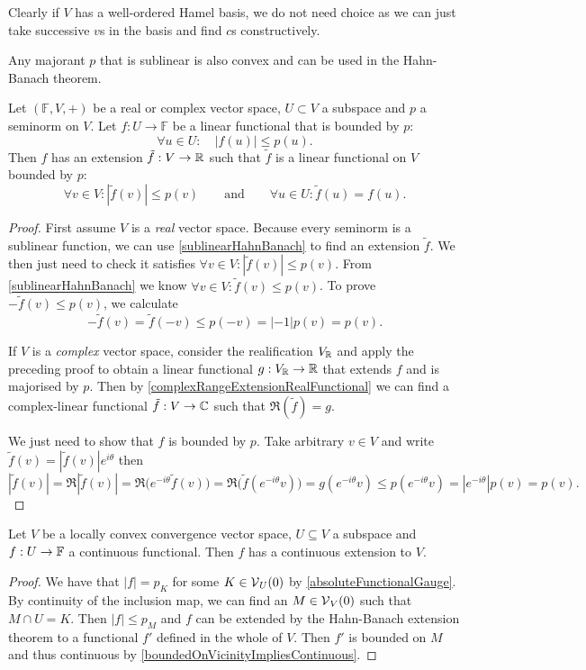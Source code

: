 Clearly if $V$ has a well-ordered Hamel basis, we do not need choice as we can just take successive $v$s in the basis and find $c$s constructively.
\begin{corollary} \label{sublinearHahnBanach}
Any majorant $p$ that is sublinear is also convex and can be used in the Hahn-Banach theorem.
\end{corollary}
\begin{corollary} \label{seminormHahnBanach}
Let $(\mathbb{F},V,+)$ be a real or complex vector space, $U\subset V$ a subspace and $p$ a seminorm on $V$. Let $f:U\to\mathbb{F}$ be a linear functional that is bounded by $p$:
\[ \forall u\in U: \quad |f(u)| \leq p(u). \]
Then $f$ has an extension $\tilde{f}: V\to \mathbb{R}$ such that $\tilde{f}$ is a linear functional on $V$ bounded by $p$:
\[ \forall v\in V: |\tilde{f}(v)| \leq p(v) \qquad \text{and} \qquad \forall u\in U: \tilde{f}(u) = f(u). \]
\end{corollary}
\begin{proof}
First assume $V$ is a \emph{real} vector space. Because every seminorm is a sublinear function, we can use \ref{sublinearHahnBanach} to find an extension $\tilde{f}$. We then just need to check it satisfies $\forall v\in V: |\tilde{f}(v)| \leq p(v)$.
From \ref{sublinearHahnBanach} we know $\forall v\in V: \tilde{f}(v) \leq p(v)$.
To prove $-\tilde{f}(v) \leq p(v)$, we calculate
\[ -\tilde{f}(v) = \tilde{f}(-v) \leq p(-v) = |-1|p(v) = p(v). \]

If $V$ is a \emph{complex} vector space, consider the realification $V_{\mathbb{R}}$ and apply the preceding proof to obtain a linear functional $g: V_{\mathbb{R}} \to \mathbb{R}$ that extends $f$ and is majorised by $p$. Then by \ref{complexRangeExtensionRealFunctional} we can find a complex-linear functional $\tilde{f}:V \to \mathbb{C}$ such that $\Re(\tilde{f}) = g$.

We just need to show that $f$ is bounded by $p$. Take arbitrary $v\in V$ and write $\tilde{f}(v) = |\tilde{f}(v)|e^{i\theta}$ then
\[ |\tilde{f}(v)| = \Re|\tilde{f}(v)| = \Re\Big(e^{-i\theta}\tilde{f}(v)\Big) = \Re\Big(\tilde{f}(e^{-i\theta}v)\Big) = g(e^{-i\theta}v) \leq p(e^{-i\theta}v) = |e^{-i\theta}|p(v) = p(v). \]
\end{proof}
\begin{corollary}
Let $V$ be a locally convex convergence vector space, $U\subseteq V$ a subspace and $f:U\to \mathbb{F}$ a continuous functional. Then $f$ has a continuous extension to $V$.
\end{corollary}
\begin{proof}
We have that $|f| = p_K$ for some $K\in \operatorname{\mathcal{V}}_U(0)$ by \ref{absoluteFunctionalGauge}. 
By continuity of the inclusion map, we can find an $M \in \operatorname{\mathcal{V}}_V(0)$ such that $M\cap U = K$. Then $|f|\leq p_M$ and $f$ can be extended by the Hahn-Banach extension theorem to a functional $f'$ defined in the whole of $V$. Then $f'$ is bounded on $M$ and thus continuous by \ref{boundedOnVicinityImpliesContinuous}.
\end{proof}


